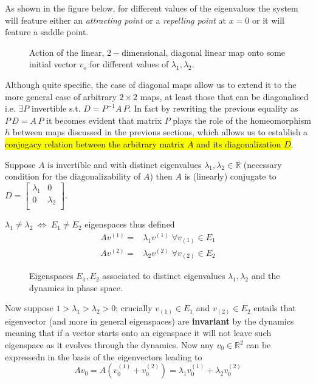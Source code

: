 \documentclass[../main.tex]{subfiles}
\begin{document}
   As shown in the figure below, for different values of the eigenvalues the system will feature either an \textit{attracting point} or a \textit{repelling point} at $x=0$ or it will feature a saddle point. 
    \begin{figure}[H]
        \centering 
        \caption{Action of the linear, $2-$dimensional, diagonal linear map onto some initial vector $v_{o}$ for different values of $\lambda_{1},\lambda_{2}$.}
        \label{fig1}
    \end{figure}
    Although quite specific, the case of diagonal maps allow us to extend it to the more general case of arbitrary $2\times 2$ maps, at least those that can be diagonalised i.e. $\exists P$ invertible s.t. $D=P^{-1}A\,P$. 
In fact by rewriting the previous equality as $P\,D=A\,P$ it becomes evident that matrix $P$ plays the role of the homeomorphism $h$ between maps discussed in the previous sections, which allows us to establish a \hl{conjugacy relation between the arbitrary matrix $A$ and its diagonalization $D$}.
\begin{proposition*}
     Suppose $A$ is invertible and with distinct eigenvalues $\lambda_{1},\lambda_{2}\in \mathbb{R}$ (necessary condition for the diagonalizability of $A$) then $A$ is (linearly) conjugate to $D=\begin{bmatrix}
             \lambda_{1} & 0 \\
             0 & \lambda_{2} \\
     \end{bmatrix}$.
\end{proposition*}
\begin{observation}\label{obs1}
     $\lambda_{1}\neq \lambda_{2}\;\iff\;E_{1}\neq E_{2}$ eigenspaces thus defined
     \begin{align}
          Av^{(1)} =& \lambda_{1}v^{(1)}\; \forall v_{(1)}\in E_{1}  \nonumber \\
           Av^{(2)} =& \lambda_{2}v^{(2)}\; \forall v_{(2)}\in E_{2} \nonumber 
   \end{align}
     \begin{figure}[H]
         \centering 
         \caption{Eigenspaces $E_{1}, E_{2}$ associated to distinct eigenvalues $\lambda_{1}, \lambda_{2}$ and the dynamics in phase space.}
          \label{fig3}
     \end{figure}
  Now suppose $1>\lambda_{1}>\lambda_{2}>0$; crucially $v_{(1)}\in E_{1}$ and $v_{(2)}\in E_{2}$ entails that eigenvector (and more in general eigenspaces) are \textbf{invariant} by the dynamics meaning that if a vector starts onto an eigenspace it will not leave such eigenspace as it evolves through the dynamics.   
  Now any $v_{0}\in \mathbb{R}^{2}$ can be expressedn in the basis of the eigenvectors leading to
  \begin{equation*}
       Av_{0}=A(v_{0}^{(1)}+v_{0}^{(2)})=\lambda_{1}v_{0}^{(1)} + \lambda_{2}v_{0}^{(2)}
  \end{equation*}
\end{observation}
\end{document}
